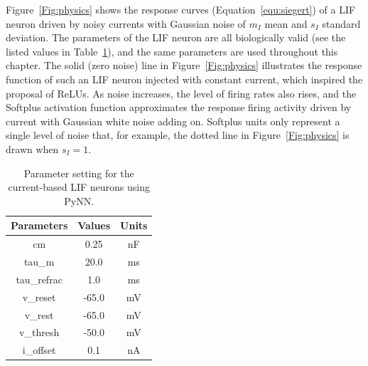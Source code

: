 	Figure~\ref{Fig:physics} shows the response curves (Equation~\ref{equ:siegert}) of a LIF neuron driven by noisy currents with Gaussian noise of $m_I$ mean and $s_I$ standard deviation.
	The parameters of the LIF neuron are all biologically valid (see the listed values in Table~\ref{tbl:pynnConfig}), and the same parameters are used throughout this chapter.
	The solid (zero noise) line in Figure~\ref{Fig:physics} illustrates the response function of such an LIF neuron injected with constant current, which inspired the proposal of ReLUs.
	As noise increases, the level of firing rates also rises, and the Softplus activation function approximates the response firing activity driven by current with Gaussian white noise adding on.
	Softplus units only represent a single level of noise that, for example, the dotted line in Figure~\ref{Fig:physics} is drawn when $s_I=1$.
	
		\begin{table}[bt]
			\centering
			\caption{\label{tbl:pynnConfig}Parameter setting for the current-based LIF neurons using PyNN.}
			\bgroup
			\def\arraystretch{1.4}
			\begin{tabular}{c c c}
				Parameters & Values & Units \\
				\hline
				cm & 0.25 & nF	\\
				tau\_m & 20.0 & ms\\
				tau\_refrac & 1.0 & ms\\
				v\_reset & -65.0 & mV\\
				v\_rest & -65.0 & mV\\
				v\_thresh & -50.0 & mV\\
				i\_offset & 0.1 & nA\\
				\hline
			\end{tabular}
			\egroup
		\end{table}
	

